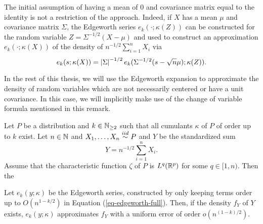 \begin{remark} \label{rem-centering}
    The initial assumption of having a mean of 0 and covariance matrix equal to the identity is not a restriction of the approach. Indeed, if $X$ has a mean $\mu$ and covariance matrix $\Sigma$, the Edgeworth series $e_k(\cdot; \kappa(Z))$ can be constructed for the random variable $Z = \Sigma^{-1/2}(X - \mu)$ and used to construct an approximation $e_k(\cdot; \kappa(X))$ of the density of $n^{-1/2} \sum_{i=1}^n X_i$ via
    \begin{equation*}
        e_k(s; \kappa(X)) = \left|\Sigma\right|^{-1/2} e_k(\Sigma^{-1/2}(s - \sqrt{n}\mu); \kappa(Z)).
    \end{equation*}

    In the rest of this thesis, we will use the Edgeworth expansion to approximate the density of random variables which are not necessarily centered or have a unit covariance. In this case, we will implicitly make use of the change of variable formula mentioned in this remark. 
\end{remark}

\begin{theorem} \label{thm-edgeworth}
    Let $P$ be a distribution and $k \in \mathbb{N}_{\geq 2}$ such that all cumulants $\kappa$ of $P$ of order up to $k$ exist. Let $n \in \mathbb{N}$ and $X_1, \ldots, X_n \stackrel{iid}{\sim} P$ and $Y$ be the standardized sum
    \begin{equation*}
        Y = n^{-1/2}\sum_{i=1}^n X_i.
    \end{equation*}
    Assume that the characteristic function $\zeta$ of $P$ is $L^q({\mathbb{R}^p})$ for some $q \in [1, n)$. Then the
    
    Let $e_k(y; \kappa)$ be the Edgeworth series, constructed by only keeping terms order up to $O(n^{1-k/2})$ in Equation (\ref{eq-edgeworth-full}). Then, if the density $f_Y$ of $Y$ exists, $e_k(y; \kappa)$ approximates $f_Y$ with a uniform error of order $o(n^{(1 - k)/2})$.
\end{theorem}

